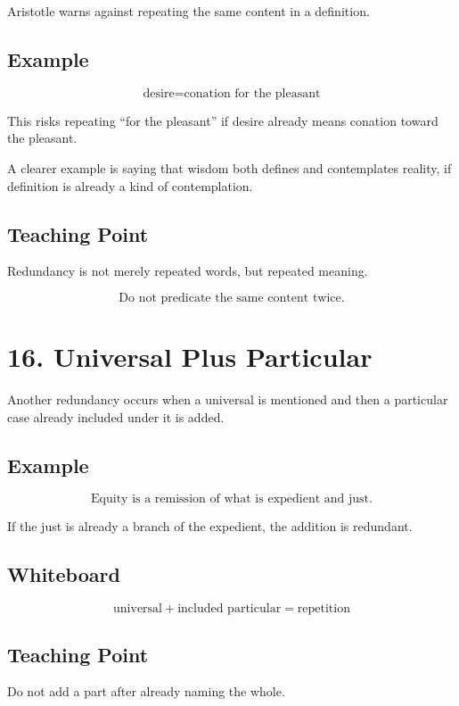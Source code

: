 \documentclass[12pt]{article}
\begin{document}
Aristotle warns against repeating the same content in a definition.

\subsection*{Example}

\[
\text{desire} = \text{conation for the pleasant}
\]

This risks repeating ``for the pleasant'' if desire already means conation
toward the pleasant.

A clearer example is saying that wisdom both defines and contemplates reality,
if definition is already a kind of contemplation.

\subsection*{Teaching Point}

Redundancy is not merely repeated words, but repeated meaning.

\[
\boxed{
\text{Do not predicate the same content twice.}
}
\]

\section*{16. Universal Plus Particular}

Another redundancy occurs when a universal is mentioned and then a particular
case already included under it is added.

\subsection*{Example}

\[
\text{Equity is a remission of what is expedient and just.}
\]

If the just is already a branch of the expedient, the addition is redundant.

\subsection*{Whiteboard}

\[
\text{universal} + \text{included particular} = \text{repetition}
\]

\subsection*{Teaching Point}

Do not add a part after already naming the whole.
\end{document}
